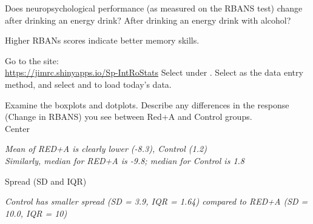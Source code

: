 \begin{enumerate}
  {\sf
    Does neuropsychological performance (as measured on the RBANS
    test) change after drinking an energy drink?  After drinking an
    energy drink with alcohol? }

   Higher RBANs scores indicate better memory skills. 

Go to the site:\\
  \url{https://jimrc.shinyapps.io/Sp-IntRoStats}
  Select  under . Select  as the data entry method, and
  select  and  to load today's
  data. 
 

   Examine the boxplots and dotplots. Describe any differences in the
   response (Change in RBANS) you see  between Red+A and Control groups. \\

   Center
\begin{students}
    \vspace{1cm}    
\end{students}

\begin{key}
  {\it Mean of RED+A is clearly  lower (-8.3), Control  (1.2)\\
  Similarly, median for RED+A is -9.8; median for Control is 1.8 }
\end{key}

   Spread  (SD and IQR)
\begin{students}
    \vspace{1cm}    
\end{students}

\begin{key}
  {\it      Control has smaller spread (SD = 3.9, IQR = 1.64)
     compared to  RED+A (SD = 10.0, IQR = 10) 
}
\end{key}



\end{enumerate}
